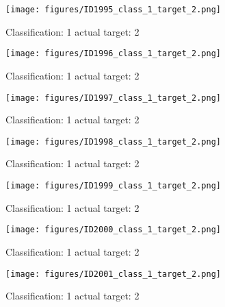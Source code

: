 \begin{figure}[h!]
\begin{center}
\texttt{[image: figures/ID1995\_class\_1\_target\_2.png]}
\end{center}
\caption{ Classification: 1 actual target: 2}
\label{fig:ID1995_class_1_target_2}
\end{figure}
\begin{figure}[h!]
\begin{center}
\texttt{[image: figures/ID1996\_class\_1\_target\_2.png]}
\end{center}
\caption{ Classification: 1 actual target: 2}
\label{fig:ID1996_class_1_target_2}
\end{figure}
\begin{figure}[h!]
\begin{center}
\texttt{[image: figures/ID1997\_class\_1\_target\_2.png]}
\end{center}
\caption{ Classification: 1 actual target: 2}
\label{fig:ID1997_class_1_target_2}
\end{figure}
\begin{figure}[h!]
\begin{center}
\texttt{[image: figures/ID1998\_class\_1\_target\_2.png]}
\end{center}
\caption{ Classification: 1 actual target: 2}
\label{fig:ID1998_class_1_target_2}
\end{figure}
\begin{figure}[h!]
\begin{center}
\texttt{[image: figures/ID1999\_class\_1\_target\_2.png]}
\end{center}
\caption{ Classification: 1 actual target: 2}
\label{fig:ID1999_class_1_target_2}
\end{figure}
\begin{figure}[h!]
\begin{center}
\texttt{[image: figures/ID2000\_class\_1\_target\_2.png]}
\end{center}
\caption{ Classification: 1 actual target: 2}
\label{fig:ID2000_class_1_target_2}
\end{figure}
\begin{figure}[h!]
\begin{center}
\texttt{[image: figures/ID2001\_class\_1\_target\_2.png]}
\end{center}
\caption{ Classification: 1 actual target: 2}
\label{fig:ID2001_class_1_target_2}
\end{figure}
